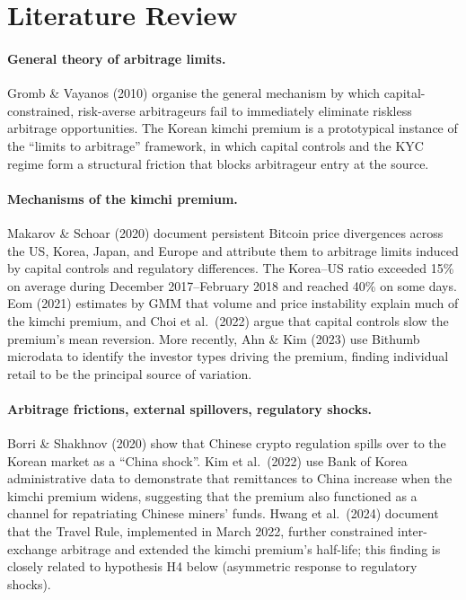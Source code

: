 \documentclass[11pt,a4paper]{article}
\begin{document}
\section{Literature Review}

\paragraph{General theory of arbitrage limits.}
Gromb \& Vayanos (2010) organise the general mechanism by which capital-constrained, risk-averse
arbitrageurs fail to immediately eliminate riskless arbitrage opportunities. The Korean kimchi
premium is a prototypical instance of the ``limits to arbitrage'' framework, in which capital
controls and the KYC regime form a structural friction that blocks arbitrageur entry at the source.

\paragraph{Mechanisms of the kimchi premium.}
Makarov \& Schoar (2020) document persistent Bitcoin price divergences across the US, Korea, Japan,
and Europe and attribute them to arbitrage limits induced by capital controls and regulatory
differences. The Korea--US ratio exceeded 15\% on average during December 2017--February 2018 and
reached 40\% on some days. Eom (2021) estimates by GMM that volume and price instability explain
much of the kimchi premium, and Choi et al.\ (2022) argue that capital controls slow the
premium's mean reversion. More recently, Ahn \& Kim (2023) use Bithumb microdata to identify the
investor types driving the premium, finding individual retail to be the principal source of variation.

\paragraph{Arbitrage frictions, external spillovers, regulatory shocks.}
Borri \& Shakhnov (2020) show that Chinese crypto regulation spills over to the Korean market as a
``China shock''. Kim et al.\ (2022) use Bank of Korea administrative data to demonstrate that
remittances to China increase when the kimchi premium widens, suggesting that the premium also
functioned as a channel for repatriating Chinese miners' funds. Hwang et al.\ (2024) document that
the Travel Rule, implemented in March 2022, further constrained inter-exchange arbitrage and
extended the kimchi premium's half-life; this finding is closely related to hypothesis H4 below
(asymmetric response to regulatory shocks).
\end{document}

